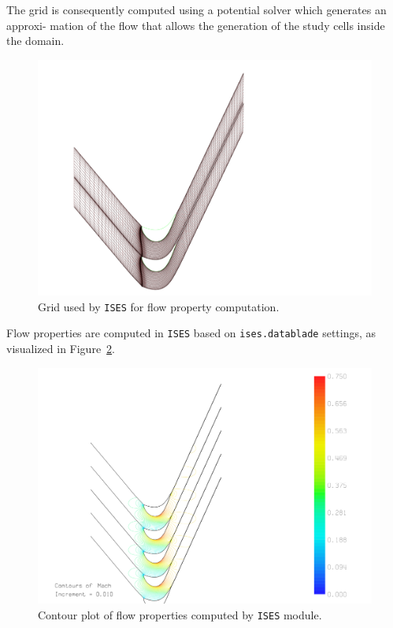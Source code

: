 The grid is consequently computed using a potential solver which generates an approxi-
mation of the flow that allows the generation of the study cells inside the domain.

\begin{figure}[H]
    \centering
    \hspace*{-1cm}
    \includegraphics[scale=0.87]{figures/datablade120-3.png}
    \caption{Grid used by \texttt{ISES} for flow property computation.}
    \label{fig:misesGrid}
\end{figure}

Flow properties are computed in \texttt{ISES} based on \texttt{ises.datablade} settings, as visualized in Figure~\ref{fig:misesFlow}.

\begin{figure}[H]
    \centering
    \hspace*{-0.5cm}
    \includegraphics[width=1.1\textwidth]{figures/datablade120-4.png}
    \caption{Contour plot of flow properties computed by \texttt{ISES} module.}
    \label{fig:misesFlow}
\end{figure}

